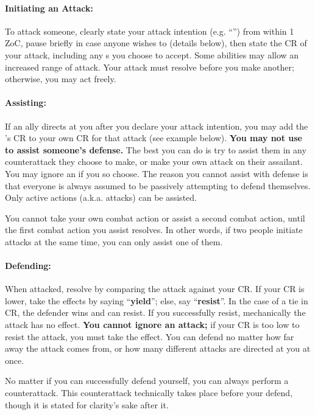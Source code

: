 \documentclass[sheet]{GL2020}
\begin{document}
\paragraph{Initiating an Attack:} To attack someone, clearly state your attack intention (e.g. ``\aKnockOut{}'') from within 1 ZoC, pause briefly in case anyone wishes to \aAssist{} (details below), then state the CR of your attack, including any \aAssist{}s you choose to accept. Some abilities may allow an increased range of attack. Your attack must resolve before you make another; otherwise, you may act freely. 

\paragraph{Assisting:} If an ally directs {\bf \aAssist{}} at you after you declare your attack intention, you may add the \aAssist{}'s CR to your own CR for that attack (see example below). \textbf{You may not use \aAssist{} to assist someone's defense.} The best you can do is try to assist them in any counterattack they choose to make, or make your own attack on their assailant. You may ignore an \aAssist{} if you so choose. The reason you cannot assist with defense is that everyone is always assumed to be passively attempting to defend themselves. Only active actions (a.k.a. attacks) can be assisted.

You cannot take your own combat action or assist a second combat action, until the first combat action you assist resolves. In other words, if two people initiate attacks at the same time, you can only assist one of them.

\paragraph{Defending:} When attacked, resolve by comparing the attack against your CR. If your CR is lower, take the effects by saying ``\textbf{yield}''; else, say ``{\bf resist}''. In the case of a tie in CR, the defender wins and can resist. If you successfully resist, mechanically the attack has no effect. \textbf{You cannot ignore an attack;} if your CR is too low to resist the attack, you must take the effect. You can defend no matter how far away the attack comes from, or how many different attacks are directed at you at once. 

No matter if you can successfully defend yourself, you can always perform a counterattack. This counterattack technically takes place before your defend, though it is stated for clarity's sake after it. 
\end{document}

